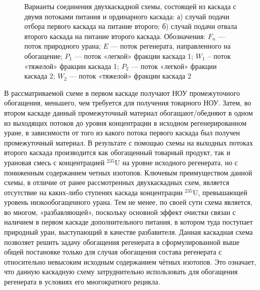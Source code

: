 \begin{figure}[ht]
  \caption{Варианты соединения двухкаскадной схемы, состоящей из каскада с двумя потоками питания и ординарного каскада: а) случай подачи отбора первого каскада на питание второго; б) случай подачи отвала второго каскада на питание второго каскада. Обозначения: $F_{n}$ --- поток природного урана; $E$ --- поток регенерата, направленного на обогащение; $P_1$ --- поток «легкой» фракции каскада 1; $W_1$ – поток «тяжелой» фракции каскада 1; $P_2$ --- поток «легкой» фракции каскада 2; $W_2$ --- поток «тяжелой» фракции каскада 2}\label{f_2double}
\end{figure}

В рассматриваемой схеме в первом каскаде получают НОУ промежуточного обогащения, меньшего, чем требуется для получения товарного НОУ. Затем, во втором каскаде данный промежуточный материал обогащают/обедняют в одном из выходящих потоков до уровня концентрации в исходном регенерированном уране, в зависимости от того из какого потока первого каскада был получен промежуточный материал. В результате с помощью схемы на выходных потоках второго каскада производится как обогащенный товарный продукт, так и урановая смесь с концентрацией $^{235}$U на уровне исходного регенерата, но с пониженным содержанием четных изотопов. Ключевым преимуществом данной схемы, в отличие от ранее рассмотренных двухкаскадных схем, является отсутствие на каких-либо ступенях каскада концентрации $^{235}$U, превышающей уровень низкообогащенного урана.
Тем не менее, по своей сути схема является, во многом, «разбавляющей», поскольку основной эффект очистки связан с наличием в первом каскаде дополнительного питания, в котором туда поступает природный уран, выступающий в качестве разбавителя.
Данная каскадная схема позволяет решить задачу обогащения регенерата в сформулированной выше общей постановке только для случая  обогащения состава регенерата с относительно невысоким исходным содержанием чётных изотопов. Это означает, что данную каскадную схему затруднительно использовать для обогащения регенерата в условиях его многократного рецикла.

